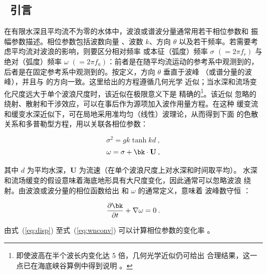 \vssub
\subsection{~引言} \label{sec:intro}
\vssub

在有限水深且平均流不为零的水体中，波浪或谱波分量通常用若干相位参数和
振幅参数描述。相位参数包括波数向量 {\bk}、波数 $k$、方向
$\theta$ 以及若干频率。若需要考虑平均流对波浪的影响，则要区分相对频率
或本征（弧度）频率 $\sigma$ $(= 2 \pi f_r)$ 与绝对（弧度）频率
$\omega$ $(= 2 \pi f_a)$：前者是在随平均流运动的参考系中观测到的，
后者是在固定参考系中观测到的。按定义，方向 $\theta$ 垂直于波峰
（或谱分量的波峰），并且与 {\bk} 的方向一致。这里给出的方程遵循几何光学
近似；当水深和流场变化尺度远大于单个波浪尺度时，该近似在极限意义下是
精确的\footnote{即使波高在半个波长内变化达 5 倍，几何光学近似仍可给出
合理结果，这一点已在海底峡谷算例中得到说明 \citep{art:Mea07}。}。该近似
忽略的绕射、散射和干涉效应，可以在事后作为源项加入波作用量方程。在这种
缓变流和缓变水深近似下，可在局地采用准均匀（线性）波理论，从而得到下面
的色散关系和多普勒型方程，用以关联各相位参数：


\begin{equation}
\sigma ^2 = g k \tanh kd \: ,
\label{eq:disp}
\end{equation}
\begin{equation}
\omega = \sigma + {\bk} \cdot {\bf U} \: ,
\label{eq:doppler}
\end{equation}

\noindent 
其中 $d$ 为平均水深，{\bf U} 为流速（在单个波浪尺度上对水深和时间取平均）。
水深和流场缓变的假设意味着海底地形具有大尺度变化，因此通常可以忽略波浪
绕射。由波浪或波分量的相位函数给出 {\bk} 和 $\omega$ 的通常定义，意味着
波峰数守恒 \citep[参见，例如][]{bk:Phi77,bk:Mei83}：


\begin{equation}
\frac{\partial {\bk}}{\partial t} + \nabla \omega = 0 \: .
\label{eq:wnconv}
\end{equation}


由式~(\ref{eq:disp}) 至式~(\ref{eq:wnconv}) 可以计算相位参数的变化率
\citep[例如，相关方程此处不再列出][]{rep:Chr82,bk:Mei83,tol:JPO90}。

